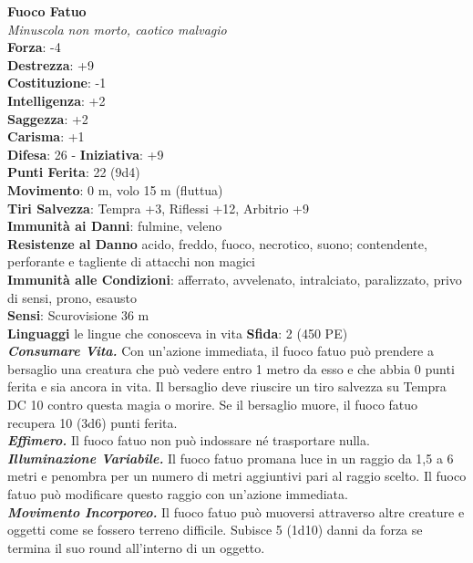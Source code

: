 \begin{multicols}{2}
\medskip\textbf{Fuoco Fatuo}\\
\emph{Minuscola non morto, caotico malvagio}\\
\textbf{Forza}: -4\\
\textbf{Destrezza}: +9\\
\textbf{Costituzione}: -1\\
\textbf{Intelligenza}: +2\\
\textbf{Saggezza}: +2\\
\textbf{Carisma}: +1\\
\textbf{Difesa}: 26 - \textbf{Iniziativa}: +9\\
\textbf{Punti Ferita}: 22 (9d4)\\
\textbf{Movimento}: 0 m, volo 15 m (fluttua)\\
\textbf{Tiri Salvezza}: Tempra +3, Riflessi +12, Arbitrio +9\\
\textbf{Immunità ai Danni}: fulmine, veleno\\
\textbf{Resistenze al Danno} acido, freddo, fuoco, necrotico, suono; contendente, perforante e tagliente di attacchi non magici\\
\textbf{Immunità alle Condizioni}: afferrato, avvelenato, intralciato, paralizzato, privo di sensi, prono, esausto\\
\textbf{Sensi}: Scurovisione 36 m\\
\textbf{Linguaggi} le lingue che conosceva in vita
\textbf{Sfida}: 2 (450 PE)\smallskip\\
\emph{\textbf{Consumare Vita.}} Con un'azione immediata, il fuoco fatuo può prendere a bersaglio una creatura che può vedere entro 1 metro da esso e che abbia 0 punti ferita e sia ancora in vita. Il bersaglio deve riuscire un tiro salvezza su Tempra DC 10 contro questa magia o morire. Se il bersaglio muore, il fuoco fatuo recupera 10 (3d6) punti ferita.\\
\emph{\textbf{Effimero.}} Il fuoco fatuo non può indossare né trasportare nulla.\\
\emph{\textbf{Illuminazione Variabile.}} Il fuoco fatuo promana luce in un raggio da 1,5 a 6 metri e penombra per un numero di metri aggiuntivi pari al raggio scelto. Il fuoco fatuo può modificare questo raggio con un'azione immediata.\\
\emph{\textbf{Movimento Incorporeo.}} Il fuoco fatuo può muoversi attraverso altre creature e oggetti come se fossero terreno difficile. Subisce 5 (1d10) danni da forza se termina il suo round all'interno di un oggetto.\\

\end{multicols}

